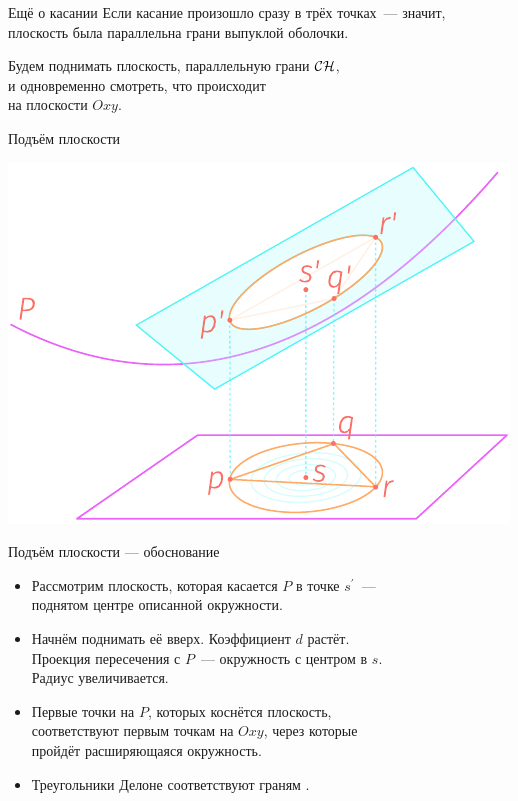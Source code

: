 \begin{frame}{Ещё о касании}
	Если касание произошло сразу в трёх точках~— значит, \\
	плоскость была параллельна грани выпуклой оболочки.

	Будем поднимать плоскость, параллельную грани \(\mathcal{C}\mathcal{H}\), \\
	и одновременно смотреть, что происходит \\
	на плоскости \(Oxy\).
\end{frame}


\begin{frame}{Подъём плоскости}
\begin{center} \includegraphics[scale=1.1]{svg/paraboloid} \end{center}
\end{frame}


\begin{frame}{Подъём плоскости — обоснование}
\begin{itemize}
	\item Рассмотрим плоскость, которая касается \(P\) в точке \(s^\prime\)~— \\
	поднятом центре описанной окружности. \medskip

	\item Начнём поднимать её вверх. Коэффициент \(d\) растёт. \\
	Проекция пересечения с \(P\)~— окружность с центром в \(s\). \\
	Радиус увеличивается. \medskip

	\item Первые точки на \(P\), которых коснётся плоскость, \\
	соответствуют первым точкам на \(Oxy\), через которые \\
	пройдёт расширяющаяся окружность. \medskip

	\item Треугольники Делоне соответствуют граням \CH.
\end{itemize}
\end{frame}


